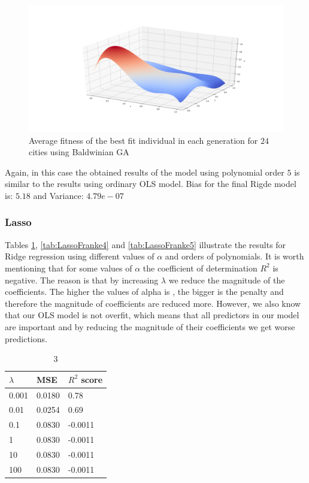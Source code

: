 \documentclass [11pt]{article}
\begin{document}
\begin{figure}[H]
\centering
\includegraphics[width=1\textwidth]{figures/RidgeFranke.png}
        \caption{Average fitness of the best fit individual in each generation for $24$ cities using Baldwinian GA}
        \label{fig:RidgeFranke}
\end{figure}
Again, in this case the obtained results of the model using polynomial order $5$ is similar to the results using ordinary OLS model. Bias for the final Rigde model is: $5.18$ and Variance: $4.79e-07$


\subsubsection{Lasso}
Tables \ref{tab:LassoFranke3}, \ref{tab:LassoFranke4} and \ref{tab:LassoFranke5} illustrate the results for Ridge regression using different values of $\alpha$ and orders of polynomials. It is worth mentioning that for some values of $\alpha$ the coefficient of determination $R^{2}$ is negative. The reason is that by increasing $\lambda$ we reduce the magnitude of the coefficients. The higher the values of alpha is , the bigger is the penalty and therefore the magnitude of coefficients are reduced more. However, we also know that our OLS model is not overfit, which means that all predictors in our model are important and by reducing the magnitude of their coefficients we get worse predictions. 


\begin{table}[H]
\centering
\begin{tabular}{lll}
\hline
$\lambda$ & MSE    & $R^{2}$ score \\ \hline
0.001     & 0.0180 & 0.78          \\
0.01      & 0.0254 & 0.69          \\
0.1       & 0.0830 & -0.0011       \\
1         & 0.0830 & -0.0011       \\
10        & 0.0830 & -0.0011       \\
100       & 0.0830 & -0.0011       \\ \hline
\end{tabular}
\caption{3}
\label{tab:LassoFranke3}
\end{table}
\end{document}
